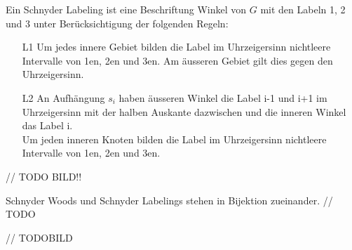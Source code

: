 \begin{definition}
Ein Schnyder Labeling ist eine Beschriftung Winkel von $G$ mit den Labeln 1, 2 und 3 unter Berücksichtigung der folgenden Regeln:
\begin{itemize}
\item[L1] Um jedes innere Gebiet bilden die Label im Uhrzeigersinn nichtleere Intervalle von 1en, 2en und 3en. Am äusseren Gebiet gilt dies gegen den Uhrzeigersinn.
\item[L2] An Aufhängung $s_i$ haben äusseren Winkel die Label i-1 und i+1 im Uhrzeigersinn mit der halben Auskante dazwischen und die inneren Winkel das Label i.\\
Um jeden inneren Knoten bilden die Label im Uhrzeigersinn nichtleere Intervalle von 1en, 2en und 3en.
\end{itemize} 

\end{definition}

// TODO BILD!!

\begin{theorem}
Schnyder Woods und Schnyder Labelings stehen in Bijektion zueinander.
// TODO  
\end{theorem}

// TODOBILD

\